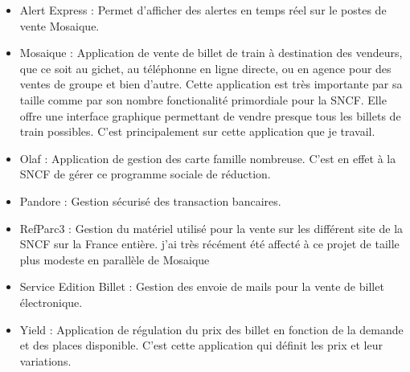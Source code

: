     \begin{itemize}
        \item Alert Express : Permet d'afficher des alertes en temps réel sur le postes de vente Mosaique.
        \item Mosaique : Application de vente de billet de train à destination des vendeurs, que ce soit au gichet, au téléphonne en ligne directe, ou en agence pour des ventes de groupe et bien d'autre. Cette application est très importante par sa taille comme par son nombre fonctionalité primordiale pour la SNCF. Elle offre une interface graphique permettant de vendre presque tous les billets de train possibles. C'est principalement sur cette application que je travail.
        \item Olaf : Application de gestion des carte famille nombreuse. C'est en effet à la SNCF de gérer ce programme sociale de réduction.
        \item Pandore : Gestion sécurisé des transaction bancaires.
        \item RefParc3 : Gestion du matériel utilisé pour la vente sur les différent site de la SNCF sur la France entière. j'ai très récément été affecté à ce projet de taille plus modeste en parallèle de Mosaique
        \item Service Edition Billet : Gestion des envoie de mails pour la vente de billet électronique.
        \item Yield : Application de régulation du prix des billet en fonction de la demande et des places disponible. C'est cette application qui définit les prix et leur variations. 
    \end{itemize}